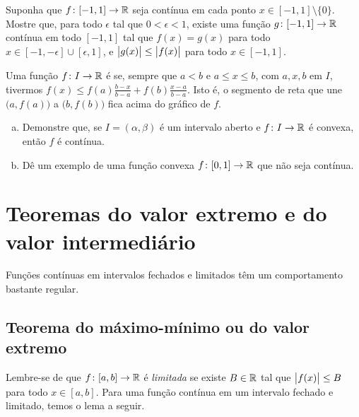 \begin{exercise}
Suponha que $f \colon [-1,1] \to {\mathbb{R}}$ seja contínua em cada ponto
$x \in [-1,1] \setminus \{ 0 \}$. Mostre que, para todo $\epsilon$
tal que $0 < \epsilon < 1$, existe uma função
$g \colon [-1,1] \to {\mathbb{R}}$ contínua em todo $[-1,1]$ tal que
$f(x) = g(x)$ para todo $x \in [-1,-\epsilon] \cup [\epsilon,1]$, e
$\bigl\lvert {g(x)} \bigr\rvert \leq \bigl\lvert {f(x)} \bigr\rvert$ para todo $x \in [-1,1]$.
\end{exercise}

\begin{exercise}[Desafiador]
Uma função $f \colon I \to {\mathbb{R}}$ é \emph{} se,
sempre que $a < b$ e $a \leq x \leq b$, com $a,x,b$ em $I$, tivermos
$f(x) \leq f(a) \frac{b-x}{b-a} + f(b) \frac{x-a}{b-a}$. Isto é,
o segmento de reta que une $\bigl(a,f(a)\bigr)$ a $\bigl(b,f(b)\bigr)$ fica acima
do gráfico de $f$.
\begin{enumerate}[a)]
\item
Demonstre que, se $I = (\alpha,\beta)$ é um intervalo aberto e
$f \colon I \to {\mathbb{R}}$ é convexa, então $f$ é contínua.
\item
Dê um exemplo de uma função convexa $f \colon [0,1] \to {\mathbb{R}}$ que não seja contínua.
\end{enumerate}
\end{exercise}


\sectionnewpage

\section{Teoremas do valor extremo e do valor intermediário}
\label{sec:minmaxint}



Funções contínuas em intervalos fechados e limitados
têm um comportamento bastante regular.

\subsection{Teorema do máximo-mínimo ou do valor extremo}

Lembre-se de que $f \colon [a,b] \to {\mathbb{R}}$ é
\emph{limitada}
se existe $B \in {\mathbb{R}}$ tal que
$\bigl\lvert {f(x)} \bigr\rvert \leq B$ para todo $x \in [a,b]$.
Para uma função contínua em um intervalo fechado e limitado, temos o lema a seguir.

